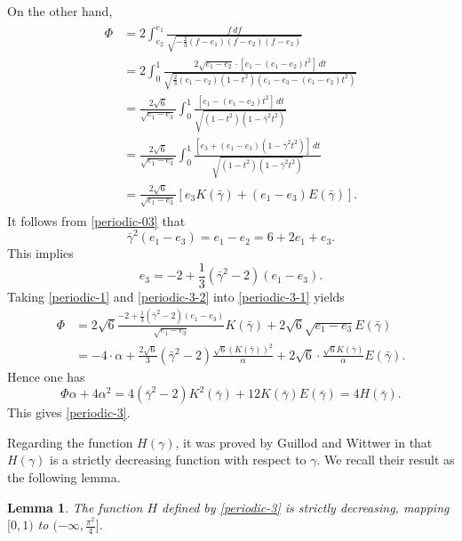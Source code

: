 \documentclass[reqno,12pt]{amsart}
\newtheorem{lemma}[theorem]{Lemma}
\begin{document}
    On the other hand, 
\begin{align}\label{periodic-3-1} 
\begin{aligned}
    \Phi & = 2 \int_{e_2}^{e_1}\frac{f\, df}{\sqrt{-\frac23 (f-e_1) (f-e_2) (f-e_3)}}\\ 
    & = 2 \int_{0}^{1} \frac{ 2\sqrt{e_1 - e_2} \cdot \left[e_1 - (e_1-e_2)t^2\right]\, dt}{\sqrt{\frac23 (e_1-e_2)  (1-t^2) (e_1 - e_3 - (e_1 -e_2)t^2 )}}\\
    &= \frac{2\sqrt{6}}{\sqrt{e_1-e_3}}\int_0^1 \frac{[ e_1 -(e_1-e_2)t^2 ] \, dt}{\sqrt{(1-t^2)(1- \bar{\gamma}^2 t^2)}}\\
    &= \frac{2 \sqrt{6}}{\sqrt{e_1-e_3}} \int_0^1 \frac{[e_3 +   (e_1 - e_3) (1 -  \bar{\gamma}^2 t^2)]\, dt}{\sqrt{(1-t^2)(1- \bar{\gamma}^2t^2)}}\\
    &= \frac{2\sqrt{6}}{\sqrt{e_1-e_3}} \left[e_3 K( \bar{\gamma}) + (e_1-e_3) E( \bar{\gamma})\right].
\end{aligned}
\end{align} 
It follows from \eqref{periodic-03} that
\begin{equation*}
     \bar{\gamma}^2 (e_1-e_3) = e_1 - e_2 = 6 +2e_1 +e_3.
\end{equation*}
This implies 
\begin{equation}\label{periodic-3-2}
    e_3 = -2 + \frac13 ( \bar{\gamma}^2 -2) (e_1 - e_3).
\end{equation}
Taking \eqref{periodic-1} and  \eqref{periodic-3-2} into \eqref{periodic-3-1} yields
\begin{align*}
    \Phi &= 2\sqrt{6} \frac{-2 + \frac13 ( \bar{\gamma}^2-2)(e_1-e_3)}{\sqrt{e_1-e_3}} K( \bar{\gamma}) + 2\sqrt{6}\sqrt{e_1-e_3}E( \bar{\gamma})\\
    &=  -4\cdot \alpha  + \frac{2\sqrt{6}}{3}( \bar{\gamma}^2 -2) \frac{\sqrt{6}(K( \bar{\gamma}))^2}{\alpha} + 2 \sqrt{6}\cdot \frac{\sqrt{6}K( \bar{\gamma})}{\alpha}E( \bar{\gamma}).
\end{align*}
Hence one has
\begin{equation*}
    \Phi \alpha + 4\alpha^2 = 4( \bar{\gamma}^2 -2)K^2( \bar{\gamma}) + 12 K( \bar{\gamma}) E( \bar{\gamma})=4H( \bar{\gamma}).
\end{equation*}
This gives \eqref{periodic-3}.

Regarding the function $H({\gamma})$, it was proved by Guillod and Wittwer in \cite[Appendix A]{GuillodWittwer15SIAM} that  $H( {\gamma}) $ is a strictly decreasing function with respect to $ {\gamma}$. We recall their result as the following lemma.
\begin{lemma}\label{functionH}
The function $H$ defined by \eqref{periodic-3} is strictly decreasing, mapping $[0, 1)$ to $(-\infty, \frac{\pi^2}{4}]$. 
\end{lemma}
\end{document}
